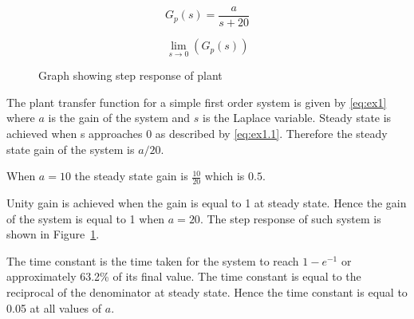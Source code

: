 \begin{equation}
    G_{p}\left(s\right)=\frac{a}{s+20}
    \label{eq:ex1}
\end{equation}

\begin{equation}
    \lim_{s\to0}\left(G_{p}\left(s\right)\right)
    \label{eq:ex1.1}
\end{equation}

\begin{figure}[ht!]
    \centering
    
    \caption{Graph showing step response of plant }
    \label{fig:ex1}
\end{figure}\FloatBarrier

The plant transfer function for a simple first order system is given by \eqref{eq:ex1} where $a$ is the gain of the system and $s$ is the Laplace variable. Steady state is achieved when s approaches 0 as described by \eqref{eq:ex1.1}. Therefore the steady state gain of the system is $a/20$.

When $a=10$ the steady state gain is $\frac{10}{20}$ which is $0.5$.

Unity gain is achieved when the gain is equal to 1 at steady state. Hence the gain of the system is equal to 1 when $a=20$. The step response of such system is shown in Figure~\ref{fig:ex1}.

The time constant is the time taken for the system to reach $1-e^{-1}$ or approximately 63.2\% of its final value. The time constant is equal to the reciprocal of the denominator at steady state. Hence the time constant is equal to 0.05 at all values of $a$.




